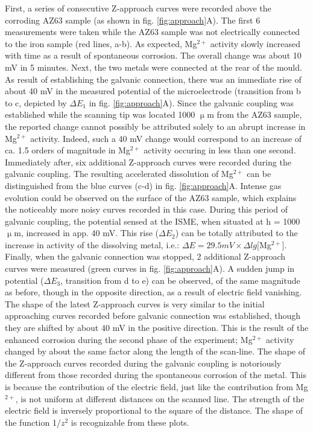 First, a series of consecutive Z-approach curves were recorded above the corroding AZ63 sample (as shown in fig. \ref{fig:approach}A).
The first 6 measurements were taken while the AZ63 sample was not electrically connected to the iron sample (red lines, a-b). As expected, Mg$^{2+}$ activity slowly increased with time as a result of spontaneous corrosion. The overall change was about 10 mV in 5 minutes. Next, the two metals were connected at the rear of the mould. As result of establishing the galvanic connection, there was an immediate rise of about 40 mV in the measured potential of the microelectrode (transition from b to c, depicted by $\Delta E_1$ in fig. \ref{fig:approach}A). Since the galvanic coupling was established while the scanning tip was located 1000 $\upmu$m from the AZ63 sample, the reported change cannot possibly be attributed solely to an abrupt increase in Mg$^{2+}$ activity. Indeed, such a 40 mV change would correspond to an increase of ca. 1.5 orders of magnitude in Mg$^{2+}$ activity occuring in less than one second. Immediately after, six additional Z-approach curves were recorded during the galvanic coupling. The resulting accelerated dissolution of Mg$^{2+}$ can be distinguished from the blue curves (c-d) in fig. \ref{fig:approach}A. Intense gas evolution could be observed on the surface of the AZ63 sample, which explains the noticeably more noisy curves recorded in this case. During this period of galvanic coupling, the potential sensed at the ISME, when situated at h = 1000 $\upmu$m, increased in app. 40 mV. This rise ($\Delta E_2$) can be totally attributed to the increase in activity of the dissolving metal, i.e.: $\Delta E = 29.5 mV \times \Delta lg[$Mg$^{2+}]$. Finally, when the galvanic connection was stopped, 2 additional Z-approach curves were measured (green curves in fig. \ref{fig:approach}A). A sudden jump in potential ($\Delta E_3$, transition from d to e) can be observed, of the same magnitude as before, though in the opposite direction, as a result of electric field vanishing. The shape of the latest Z-approach curves is very similar to the initial approaching curves recorded before galvanic connection was established, though they are shifted by about 40 mV in the positive direction. This is the result of the enhanced corrosion during the second phase of the experiment; Mg$^{2+}$ activity changed by about the same factor along the length of the scan-line. The shape of the Z-approach curves recorded during the galvanic coupling is notoriously different from those recorded during the spontaneous corrosion of the metal. This is because the contribution of the electric field, just like the contribution from Mg$^{2+}$, is not uniform at different distances on the scanned line. The strength of the electric field is inversely proportional to the square of the distance. The shape of the function 1/$z^2$ is recognizable from these plots.

